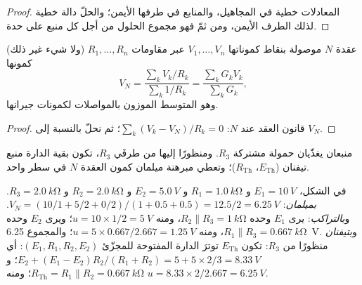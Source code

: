 \begin{proof}
المعادلات خطية في المجاهيل، والمنابع في طرفها
الأيمن؛ والحلّ دالة خطية لذلك الطرف
الأيمن، ومن ثمّ فهو مجموع الحلول من أجل كل منبع على حدة.
\end{proof}

\begin{proposition}\label{prop:b1:dc-circuits:millman}
عقدة $N$ موصولة بنقاط كموناتها $V_1, \dots, V_n$ عبر
مقاومات $R_1, \dots, R_n$ (ولا شيء غير ذلك) كمونها
\[
V_N = \frac{\sum_k V_k/R_k}{\sum_k 1/R_k} = \frac{\sum_k G_k V_k}{\sum_k G_k},
\]
وهو المتوسط الموزون بالمواصلات لكمونات جيرانها.
\end{proposition}

\begin{proof}
قانون العقد عند $N$: $\sum_k (V_k - V_N)/R_k = 0$؛ ثم نحلّ بالنسبة إلى $V_N$.
\end{proof}

\begin{omfigure}

{\small منبعان يغذّيان حمولة مشتركة $R_3$. ومنظورًا إليها من طرفَي
$R_3$، تكون بقية الدارة منبع تيفنان
($E_{\mathrm{Th}}$، $R_{\mathrm{Th}}$)؛ وتعطي مبرهنة ميلمان
كمون العقدة $N$ في سطر واحد.}
\end{omfigure}

\begin{example}\label{ex:b1:dc-circuits:threeways}
في الشكل، $E_1 = \qty{10}{V}$ و $R_1 = \qty{1.0}{k\ohm}$ و $E_2 =
\qty{5.0}{V}$ و $R_2 = \qty{2.0}{k\ohm}$ و $R_3 = \qty{2.0}{k\ohm}$.
\emph{بميلمان}: $V_N = (10/1 + 5/2 + 0/2)/(1 + 0.5 + 0.5) = 12.5/2 =
\qty{6.25}{V}$. و\emph{بالتراكب}: يرى $E_1$ وحده $R_2 \parallel
R_3 = \qty{1}{k\ohm}$، ومنه $u = 10 \times 1/2 = \qty{5}{V}$؛ ويرى $E_2$ وحده
$R_1 \parallel R_3 = \qty{0.667}{k\ohm}$، ومنه $u = 5 \times 0.667/2.667
= \qty{1.25}{V}$؛ والمجموع \qty{6.25}{V}. و\emph{بتيفنان} منظورًا من
$R_3$: تكون $E_{\mathrm{Th}}$ توترَ الدارة المفتوحة للمجزّئ
$(E_1, R_1, R_2, E_2)$: أي $E_2 + (E_1 - E_2)R_2/(R_1 + R_2) = 5 + 5 \times
2/3 = \qty{8.33}{V}$؛ و$R_{\mathrm{Th}} = R_1 \parallel R_2 =
\qty{0.667}{k\ohm}$؛ ومنه $u = 8.33 \times 2/2.667 = \qty{6.25}{V}$.
\end{example}

